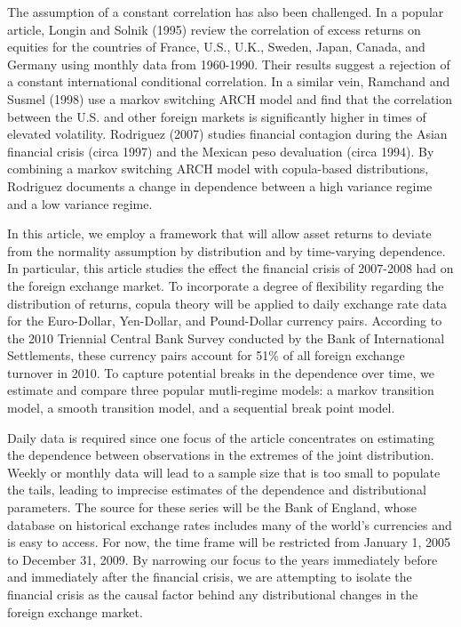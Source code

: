 \documentclass[12pt]{article}
\begin{document}
The assumption of a constant correlation has also been challenged. In a popular article, Longin and Solnik (1995) review the correlation of excess returns on equities for the countries of France, U.S., U.K., Sweden, Japan, Canada, and Germany using monthly data from 1960-1990. Their results suggest a rejection of a constant international conditional correlation. In a similar vein, Ramchand and Susmel (1998) use a markov switching ARCH model and find that the correlation between the U.S. and other foreign markets is significantly higher in times of elevated volatility. Rodriguez (2007) studies financial contagion during the Asian financial crisis (circa 1997) and the Mexican peso devaluation (circa 1994). By combining a markov switching ARCH model with copula-based distributions, Rodriguez documents a change in dependence between a high variance regime and a low variance regime.

In this article, we employ a framework that will allow asset returns to deviate from the normality assumption by distribution and by time-varying dependence. In particular, this article studies the effect the financial crisis of 2007-2008 had on the foreign exchange market. To incorporate a degree of flexibility regarding the distribution of returns, copula theory will be applied to daily exchange rate data for the Euro-Dollar, Yen-Dollar, and Pound-Dollar currency pairs. According to the 2010 Triennial Central Bank Survey conducted by the Bank of International Settlements, these currency pairs account for 51\% of all foreign exchange turnover in 2010. To capture potential breaks in the dependence over time, we estimate and compare three popular mutli-regime models: a markov transition model, a smooth transition model, and a sequential break point model.

Daily data is required since one focus of the article concentrates on estimating the dependence between observations in the extremes of the joint distribution. Weekly or monthly data will lead to a sample size that is too small to populate the tails, leading to imprecise estimates of the dependence and distributional parameters. The source for these series will be the Bank of England, whose database on historical exchange rates includes many of the world's currencies and is easy to access. For now, the time frame will be restricted from January 1, 2005 to December 31, 2009. By narrowing our focus to the years immediately before and immediately after the financial crisis, we are attempting to isolate the financial crisis as the causal factor behind any distributional changes in the foreign exchange market.
\end{document}
